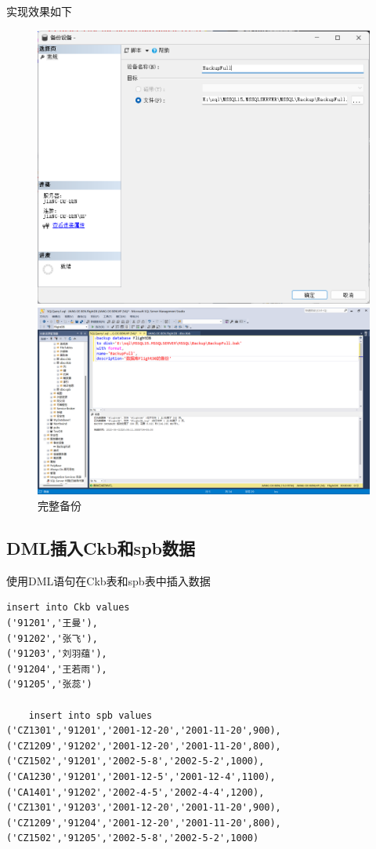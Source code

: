 \documentclass[UTF8,12pt]{article}
\begin{document}
实现效果如下
\begin{figure}[htbp]
	\centering
	\begin{minipage}{0.5\linewidth}
		\centering
		\includegraphics[width=0.9\linewidth]{img/5.png}
	\end{minipage}
	\begin{minipage}{0.5\linewidth}
		\centering
		\includegraphics[width=0.9\linewidth]{img/6.png}
	\end{minipage}
    \caption{完整备份}
\end{figure}

\subsection{DML插入Ckb和spb数据}
使用DML语句在Ckb表和spb表中插入数据
\begin{lstlisting}[title=DML插入Ckb和spb数据,frame=shadowbox]
    insert into Ckb values
('91201','王曼'),
('91202','张飞'),
('91203','刘羽蕴'),
('91204','王若雨'),
('91205','张蕊')

    insert into spb values
('CZ1301','91201','2001-12-20','2001-11-20',900),
('CZ1209','91202','2001-12-20','2001-11-20',800),
('CZ1502','91201','2002-5-8','2002-5-2',1000),
('CA1230','91201','2001-12-5','2001-12-4',1100),
('CA1401','91202','2002-4-5','2002-4-4',1200),
('CZ1301','91203','2001-12-20','2001-11-20',900),
('CZ1209','91204','2001-12-20','2001-11-20',800),
('CZ1502','91205','2002-5-8','2002-5-2',1000)
\end{lstlisting}
\end{document}
